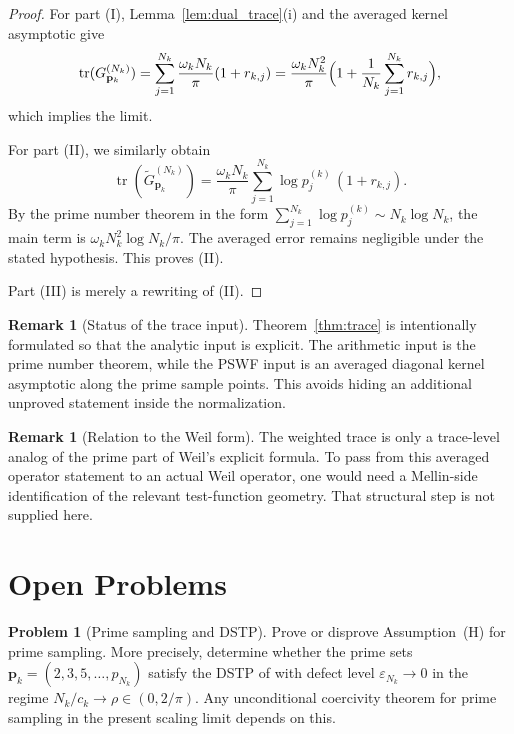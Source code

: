 \documentclass[12pt,a4paper]{amsart}
\theoremstyle{definition}
\newtheorem{remark}[theorem]{Remark}
\newtheorem{problem}{Problem}[section]
\newcommand{\GVMk}{G^{(N_k)}_{\mathbf{p}_k}}
\newcommand{\GVMkw}{\widetilde{G}^{(N_k)}_{\mathbf{p}_k}}
\begin{document}
\begin{proof}
For part (I), Lemma~\ref{lem:dual_trace}(i) and the averaged kernel asymptotic give
\[
  \operatorname{tr}(\GVMk)
  =\sum_{j=1}^{N_k}\frac{\omega_kN_k}{\pi}(1+r_{k,j})
  =\frac{\omega_kN_k^2}{\pi}\Bigl(1+\frac1{N_k}\sum_{j=1}^{N_k}r_{k,j}\Bigr),
\]
which implies the limit.

For part (II), we similarly obtain
\[
  \operatorname{tr}(\GVMkw)
  =\frac{\omega_kN_k}{\pi}
  \sum_{j=1}^{N_k}\log p_j^{(k)}\,(1+r_{k,j}).
\]
By the prime number theorem in the form
$\sum_{j=1}^{N_k}\log p_j^{(k)}\sim N_k\log N_k$, the main term is
$\omega_kN_k^2\log N_k/\pi$.
The averaged error remains negligible under the stated hypothesis.
This proves (II).

Part (III) is merely a rewriting of (II).
\end{proof}

\begin{remark}[Status of the trace input]
Theorem~\ref{thm:trace} is intentionally formulated so that the analytic input is explicit.
The arithmetic input is the prime number theorem, while the PSWF input is an averaged diagonal
kernel asymptotic along the prime sample points.
This avoids hiding an additional unproved statement inside the normalization.
\end{remark}

\begin{remark}[Relation to the Weil form]\label{rem:weil_compare}
The weighted trace is only a trace-level analog of the prime part of Weil's explicit formula.
To pass from this averaged operator statement to an actual Weil operator, one would need a
Mellin-side identification of the relevant test-function geometry.
That structural step is not supplied here.
\end{remark}

\section{Open Problems}\label{sec:open}

\begin{problem}[Prime sampling and DSTP]\label{prob:primeT2}
Prove or disprove Assumption~\textup{(H)} for prime sampling.
More precisely, determine whether the prime sets
$\mathbf p_k=(2,3,5,\ldots,p_{N_k})$ satisfy the DSTP of \cite{PaperI}
with defect level $\varepsilon_{N_k}\to0$ in the regime $N_k/c_k\to\rho\in(0,2/\pi)$.
Any unconditional coercivity theorem for prime sampling in the present scaling limit depends on this.
\end{problem}
\end{document}

